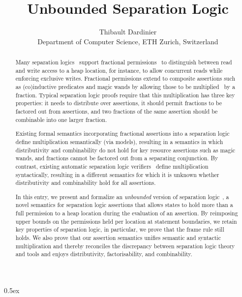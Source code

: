 \documentclass[11pt,a4paper]{article}
\begin{document}
\title{Unbounded Separation Logic}
\author{Thibault Dardinier\\
Department of Computer Science, ETH Zurich, Switzerland}

\maketitle

\begin{abstract}
	Many separation logics~\cite{Reynolds02a} support fractional permissions~\cite{Boyland03,BornatCOP05} to distinguish between read and write access to a heap location, for instance, to allow concurrent reads while enforcing exclusive writes. Fractional permissions extend to composite assertions such as (co)inductive predicates and magic wands by allowing those to be multiplied~\cite{LeHobor18,Brotherston20,Wands22} by a fraction. Typical separation logic proofs require that this multiplication has three key properties: it needs to distribute over assertions, it should permit fractions to be factored out from assertions, and two fractions of the same assertion should be combinable into one larger fraction.

	Existing formal semantics incorporating fractional assertions into a separation logic define multiplication semantically (via models), resulting in a semantics in which distributivity and combinability do not hold for key resource assertions such as magic wands, and fractions cannot be factored out from a separating conjunction. By contrast, existing automatic separation logic verifiers~\cite{LeinoMuellerSmans09,JacobsSPVPP11,MuellerSchwerhoffSummers16,vercors2017} define multiplication syntactically, resulting in a different semantics for which it is unknown whether distributivity and combinability hold for all assertions.

In this entry, we present and formalize an \emph{unbounded} version of separation logic~\cite{UnboundedSL},
a novel semantics for separation logic assertions that allows states to hold more than a full permission to a heap location during the evaluation of an assertion.
By reimposing upper bounds on the permissions held per location at statement boundaries, we retain key properties of separation logic, in particular, we prove that the frame rule still holds.
We also prove that our assertion semantics unifies semantic and syntactic multiplication and thereby reconciles the discrepancy between separation logic theory and tools and enjoys distributivity, factorisability, and combinability.
\end{abstract}

\tableofcontents

\parindent 0pt\parskip 0.5ex





\end{document}
